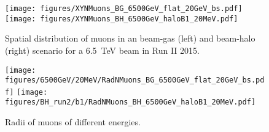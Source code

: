 \begin{figure}
  \centering
    \texttt{[image: figures/XYNMuons\_BG\_6500GeV\_flat\_20GeV\_bs.pdf]}  
    \texttt{[image: figures/XYNMuons\_BH\_6500GeV\_haloB1\_20MeV.pdf]}
  \caption{Spatial distribution of muons in an beam-gas (left) and beam-halo (right) scenario for a 6.5~TeV beam in Run II 2015. 
    \label{fig:XYNMuons2}}
\end{figure}



\begin{figure}
\begin{center}
  \texttt{[image: figures/6500GeV/20MeV/RadNMuons\_BG\_6500GeV\_flat\_20GeV\_bs.pdf]}
  \texttt{[image: figures/BH\_run2/b1/RadNMuons\_BH\_6500GeV\_haloB1\_20MeV.pdf]}      
\end{center}
\vspace{-0.6cm}
 \caption{Radii of muons of different energies.
  \label{fig:PhiEnMuComp}}
\end{figure}
